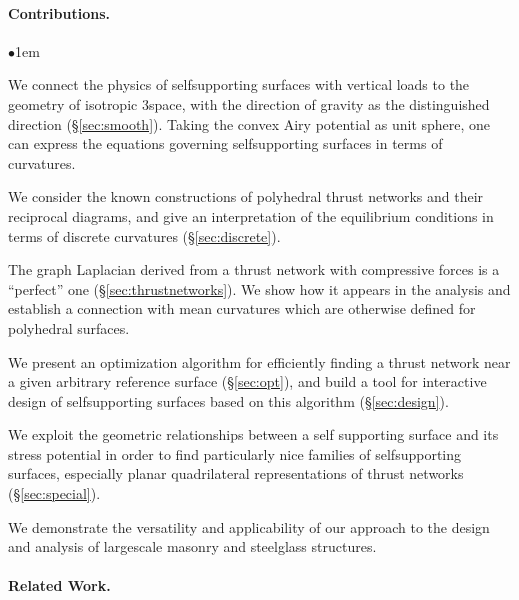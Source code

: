 \documentclass[review]{acmsiggraph}
\newcommand{\secref}[1]{(\S\ref{#1})}
\begin{document}
\paragraph{Contributions.} 

\begin{list}{$\bullet$}{\itemindent1em}

\item We connect the physics of self\dash supporting surfaces with 
vertical loads to the geometry of isotropic 3\dash space, with the 
direction of gravity as the distinguished direction \secref{sec:smooth}. 
Taking the convex Airy potential as unit sphere, one can express the 
equations governing self\dash supporting surfaces in terms of curvatures.


\item We consider the known constructions of polyhedral thrust networks and 
their reciprocal diagrams, and give an 
interpretation of the equilibrium conditions in terms of discrete 
curvatures \secref{sec:discrete}.

\item The graph Laplacian derived from a thrust network with compressive 
forces is a ``perfect'' one \secref{sec:thrustnetworks}.
We show how it appears in the analysis and 
establish a connection with mean curvatures which are otherwise defined 
for polyhedral surfaces.


\item We present an optimization algorithm for efficiently finding a 
thrust network near a given arbitrary reference surface \secref{sec:opt}, 
and build a tool for interactive design of self\dash supporting surfaces 
based on this algorithm \secref{sec:design}.

\item We exploit the geometric relationships between a self\dash 
supporting surface and its stress potential in order to find particularly 
nice families of self\dash supporting surfaces, especially planar 
quadrilateral representations of thrust networks \secref{sec:special}.

\item We demonstrate the versatility and applicability of our approach to 
the design and analysis of large\dash scale masonry and steel\dash glass 
structures.

\end{list}


\paragraph{Related Work.}
\end{document}
